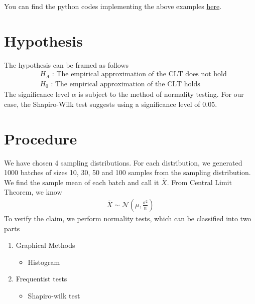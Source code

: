 \documentclass{article}
\begin{document}
\noindent You can find the python codes implementing the above examples 
\href{https://github.com/cmaspi/verifying_CLT/blob/main/codes/examples.ipynb}{here}.


\section{Hypothesis}
The hypothesis can be framed as follows
\begin{align}
    & H_A\text{ : The empirical approximation of the CLT does not hold} \nonumber\\
    & H_0\text{ : The empirical approximation of the CLT holds}\nonumber
\end{align}
The significance level $\alpha$ is subject to the method of normality testing. For our case, the Shapiro-Wilk test suggests using a significance level of $0.05$. 

\section{Procedure}
We have chosen 4 sampling distributions. For each distribution, we generated 1000 batches of sizes 10, 30, 50 and 100 samples from the sampling distribution. We find the sample mean of each batch and call it $\bar{X}$. From Central Limit Theorem, we know
\begin{align}
    \bar{X} \sim \mathcal{N}\left(\mu, \frac{\sigma^2}{n}\right)
\end{align}
To verify the claim, we perform normality tests, which can be classified into two parts
\begin{enumerate}
    \item Graphical Methods
    \begin{itemize}
        \item Histogram
    \end{itemize}
    \item{Frequentist tests}
    \begin{itemize}
        \item Shapiro-wilk test
    \end{itemize}
\end{enumerate}
\end{document}
